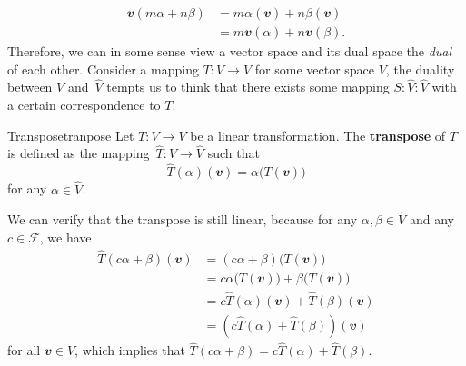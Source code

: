 \documentclass[math, code]{amznotes}
\theoremstyle{remark}
\begin{document}
\begin{align*}
    \mathbfit{v}(m\alpha + n\beta) & = m\alpha(\mathbfit{v}) + n\beta(\mathbfit{v}) \\
    & = m\mathbfit{v}(\alpha) + n\mathbfit{v}(\beta).
\end{align*}
Therefore, we can in some sense view a vector space and its dual space the \textit{dual} of each other. Consider a mapping $T \colon V \to V$ for some vector space $V$, the duality between $V$ and~$\hat{V}$ tempts us to think that there exists some mapping $S \colon \hat{V} \colon \hat{V}$ with a certain correspondence to $T$.
\begin{dfnbox}{Transpose}{tranpose}
    Let $T \colon V \to V$ be a linear transformation. The {\color{red} \textbf{transpose}} of $T$ is defined as the mapping~$\hat{T} \colon \hat{V} \to \hat{V}$ such that 
    \begin{equation*}
        \hat{T}(\alpha)(\mathbfit{v}) = \alpha\bigl(T(\mathbfit{v})\bigr)
    \end{equation*}
    for any $\alpha \in \hat{V}$. 
\end{dfnbox}
We can verify that the transpose is still linear, because for any $\alpha, \beta \in \hat{V}$ and any $c \in \mathcal{F}$, we have 
\begin{align*}
    \hat{T}(c\alpha + \beta)(\mathbfit{v}) & = (c\alpha + \beta)\bigl(T(\mathbfit{v})\bigr) \\
    & = c\alpha\bigl(T(\mathbfit{v})\bigr) + \beta\bigl(T(\mathbfit{v})\bigr) \\
    & = c\hat{T}(\alpha)(\mathbfit{v}) + \hat{T}(\beta)(\mathbfit{v}) \\
    & = \left(c\hat{T}(\alpha) + \hat{T}(\beta)\right)(\mathbfit{v})
\end{align*}
for all $\mathbfit{v} \in V$, which implies that $\hat{T}(c\alpha + \beta) = c\hat{T}(\alpha) + \hat{T}(\beta)$.
\end{document}
